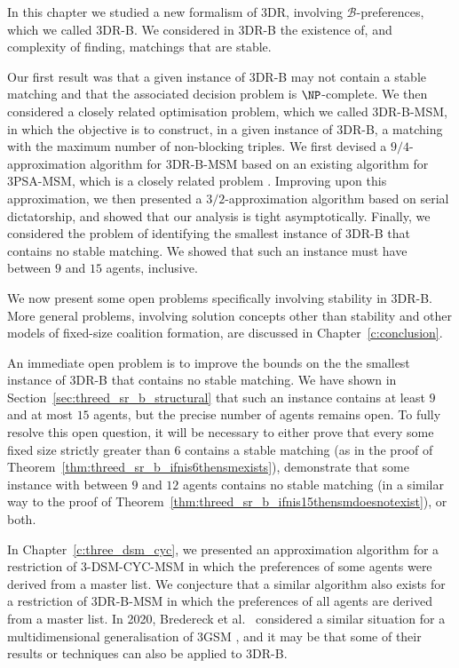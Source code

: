 In this chapter we studied a new formalism of 3DR, involving $\mathscr{B}$-preferences, which we called 3DR-B. We considered in 3DR-B the existence of, and complexity of finding, matchings that are stable. 

Our first result was that a given instance of 3DR-B may not contain a stable matching and that the associated decision problem is $\NP$-complete. We then considered a closely related optimisation problem, which we called 3DR-B-MSM, in which the objective is to construct, in a given instance of 3DR-B, a matching with the maximum number of non-blocking triples. We first devised a $9/4$-approximation algorithm for 3DR-B-MSM based on an existing algorithm for 3PSA-MSM, which is a closely related problem \cite{rosenbaum16}. Improving upon this approximation, we then presented a $3/2$-approximation algorithm based on serial dictatorship, and showed that our analysis is tight asymptotically. Finally, we considered the problem of identifying the smallest instance of 3DR-B that contains no stable matching. We showed that such an instance must have between $9$ and $15$ agents, inclusive.


We now present some open problems specifically involving stability in 3DR-B. More general problems, involving solution concepts other than stability and other models of fixed-size coalition formation, are discussed in Chapter~\ref{c:conclusion}. 

An immediate open problem is to improve the bounds on the the smallest instance of 3DR-B that contains no stable matching. We have shown in Section~\ref{sec:threed_sr_b_structural} that such an instance contains at least $9$ and at most $15$ agents, but the precise number of agents remains open. To fully resolve this open question, it will be necessary to either prove that every some fixed size strictly greater than $6$ contains a stable matching (as in the proof of Theorem~\ref{thm:threed_sr_b_ifnis6thensmexists}), demonstrate that some instance with between $9$ and $12$ agents contains no stable matching (in a similar way to the proof of Theorem~\ref{thm:threed_sr_b_ifnis15thensmdoesnotexist}), or both.

In Chapter~\ref{c:three_dsm_cyc}, we presented an approximation algorithm for a restriction of 3-DSM-CYC-MSM in which the preferences of some agents were derived from a master list. We conjecture that a similar algorithm also exists for a restriction of 3DR-B-MSM in which the preferences of all agents are derived from a master list. In 2020, Bredereck et al.\ \cite{Bre20} considered a similar situation for a multidimensional generalisation of 3GSM \cite{NH91}, and it may be that some of their results or techniques can also be applied to 3DR-B.

